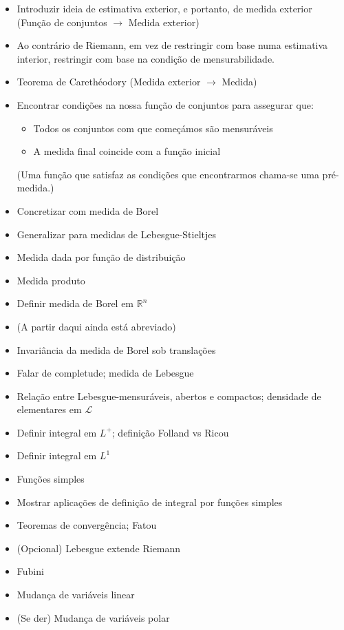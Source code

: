 \documentclass{article}
\newcommand{\R}{\mathbb{R}}
\begin{document}
\begin{itemize}
\item Introduzir ideia de estimativa exterior, e portanto, de medida exterior (Função de conjuntos $\to$ Medida exterior)
\item Ao contrário de Riemann, em vez de restringir com base numa estimativa interior, restringir com base na condição de mensurabilidade.
\item Teorema de Carethéodory (Medida exterior $\to$ Medida)
\item Encontrar condições na nossa função de conjuntos para assegurar que:
\begin{itemize}
\item Todos os conjuntos com que começámos são mensuráveis
\item A medida final coincide com a função inicial
\end{itemize}
(Uma função que satisfaz as condições que encontrarmos chama-se uma pré-medida.)
\item Concretizar com medida de Borel
\item Generalizar para medidas de Lebesgue-Stieltjes
\item Medida dada por função de distribuição
\item Medida produto
\item Definir medida de Borel em $\R^n$

\item (A partir daqui ainda está abreviado)

\item Invariância da medida de Borel sob translações
\item Falar de completude; medida de Lebesgue
\item Relação entre Lebesgue-mensuráveis, abertos e compactos; densidade de elementares em $\mathcal{L}$

\item Definir integral em $L^+$; definição Folland vs Ricou
\item Definir integral em $L^1$
\item Funções simples
\item Mostrar aplicações de definição de integral por funções simples
\item Teoremas de convergência; Fatou
\item (Opcional) Lebesgue extende Riemann
\item Fubini
\item Mudança de variáveis linear

\item (Se der) Mudança de variáveis polar
\end{itemize}
\end{document}
